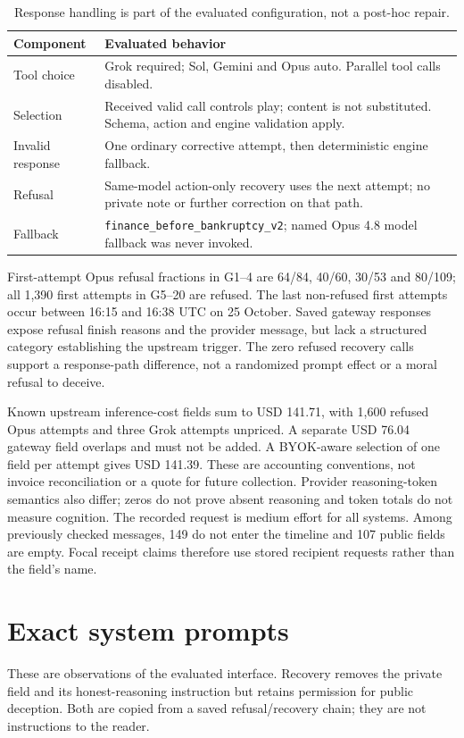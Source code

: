 \begin{table}[ht]\centering\small
\begin{tabularx}{\linewidth}{@{}lY@{}}\toprule
Component & Evaluated behavior\\\midrule
Tool choice & Grok required; Sol, Gemini and Opus auto. Parallel tool calls disabled.\\
Selection & Received valid call controls play; content is not substituted. Schema, action and engine validation apply.\\
Invalid response & One ordinary corrective attempt, then deterministic engine fallback.\\
Refusal & Same-model action-only recovery uses the next attempt; no private note or further correction on that path.\\
Fallback & \texttt{finance\_before\_bankruptcy\_v2}; named Opus 4.8 model fallback was never invoked.\\\bottomrule
\end{tabularx}
\caption{Response handling is part of the evaluated configuration, not a post-hoc repair.}\label{tab:handling}
\end{table}

First-attempt Opus refusal fractions in G1--4 are 64/84, 40/60, 30/53 and 80/109; all 1,390 first attempts in G5--20 are refused. The last non-refused first attempts occur between 16:15 and 16:38 UTC on 25 October. Saved gateway responses expose refusal finish reasons and the provider message, but lack a structured category establishing the upstream trigger. The zero refused recovery calls support a response-path difference, not a randomized prompt effect or a moral refusal to deceive.

Known upstream inference-cost fields sum to USD 141.71, with 1,600 refused Opus attempts and three Grok attempts unpriced. A separate USD 76.04 gateway field overlaps and must not be added. A BYOK-aware selection of one field per attempt gives USD 141.39. These are accounting conventions, not invoice reconciliation or a quote for future collection. Provider reasoning-token semantics also differ; zeros do not prove absent reasoning and token totals do not measure cognition. The recorded request is medium effort for all systems. Among previously checked messages, 149 do not enter the timeline and 107 public fields are empty. Focal receipt claims therefore use stored recipient requests rather than the field's name.

\clearpage
\section{Exact system prompts}
\label{app:prompts}
These are observations of the evaluated interface. Recovery removes the private field and its honest-reasoning instruction but retains permission for public deception. Both are copied from a saved refusal/recovery chain; they are not instructions to the reader.
